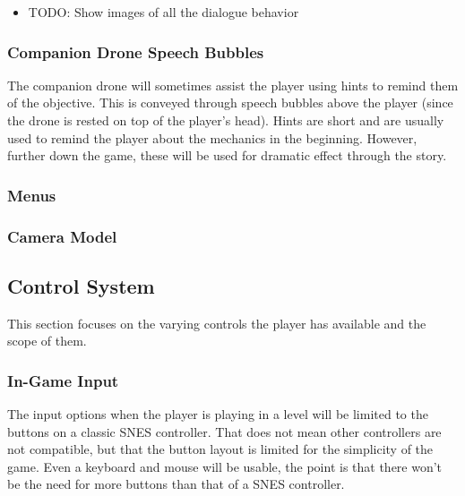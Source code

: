 \documentclass[12pt]{article}
\begin{document}
\begin{itemize}
	\item TODO: Show images of all the dialogue behavior
\end{itemize}

\subsubsection{Companion Drone Speech Bubbles}

The companion drone will sometimes assist the player using hints to remind them of the objective. This is conveyed through speech bubbles above the player (since the drone is rested on top of the player's head). Hints are short and are usually used to remind the player about the mechanics in the beginning. However, further down the game, these will be used for dramatic effect through the story.

\subsubsection{Menus}

\subsubsection{Camera Model}

\subsection{Control System}

This section focuses on the varying controls the player has available and the scope of them. 

\subsubsection{In-Game Input}

The input options when the player is playing in a level will be limited to the buttons on a classic SNES controller. That does not mean other controllers are not compatible, but that the button layout is limited for the simplicity of the game. Even a keyboard and mouse will be usable, the point is that there won't be the need for more buttons than that of a SNES controller. 
\end{document}
